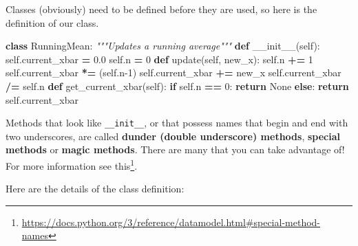 \documentclass[12pt,krantz2]{krantz}
\makeatletter
\newenvironment{Shaded}{\begin{snugshade}}{\end{snugshade}}
\newcommand{\CommentTok}[1]{\textcolor[rgb]{0.37,0.37,0.37}{\textit{#1}}}
\newcommand{\ControlFlowTok}[1]{\textcolor[rgb]{0.27,0.27,0.27}{\textbf{#1}}}
\newcommand{\DecValTok}[1]{\textcolor[rgb]{0.06,0.06,0.06}{#1}}
\newcommand{\FloatTok}[1]{\textcolor[rgb]{0.06,0.06,0.06}{#1}}
\newcommand{\FunctionTok}[1]{\textcolor[rgb]{0,0,0}{#1}}
\newcommand{\KeywordTok}[1]{\textcolor[rgb]{0.27,0.27,0.27}{\textbf{#1}}}
\newcommand{\NormalTok}[1]{#1}
\newcommand{\OperatorTok}[1]{\textcolor[rgb]{0.43,0.43,0.43}{\textbf{#1}}}
\newcommand{\VariableTok}[1]{\textcolor[rgb]{0,0,0}{#1}}
\renewcommand{\href}[2]{#2\footnote{\url{#1}}}
\newenvironment{kframe}{%
\medskip{}
\setlength{\fboxsep}{.8em}
 \def\at@end@of@kframe{}%
 \ifinner\ifhmode%
  \def\at@end@of@kframe{\end{minipage}}%
  \begin{minipage}{\columnwidth}%
 \fi\fi%
 \def\FrameCommand##1{\hskip\@totalleftmargin \hskip-\fboxsep
 \colorbox{shadecolor}{##1}\hskip-\fboxsep
     \hskip-\linewidth \hskip-\@totalleftmargin \hskip\columnwidth}%
 \MakeFramed {\advance\hsize-\width
   \@totalleftmargin\z@ \linewidth\hsize
   \@setminipage}}%
 {\par\unskip\endMakeFramed%
 \at@end@of@kframe}
\renewenvironment{Shaded}{\begin{kframe}}{\end{kframe}}
\makeatother
\begin{document}
Classes (obviously) need to be defined before they are used, so here is the definition of our class.

\begin{Shaded}
\begin{Highlighting}[]
\KeywordTok{class}\NormalTok{ RunningMean:}
    \CommentTok{"""Updates a running average"""}
    \KeywordTok{def} \FunctionTok{__init__}\NormalTok{(}\VariableTok{self}\NormalTok{):}
        \VariableTok{self}\NormalTok{.current_xbar }\OperatorTok{=} \FloatTok{0.0}
        \VariableTok{self}\NormalTok{.n }\OperatorTok{=} \DecValTok{0}
    \KeywordTok{def}\NormalTok{ update(}\VariableTok{self}\NormalTok{, new_x):}
        \VariableTok{self}\NormalTok{.n }\OperatorTok{+=} \DecValTok{1}
        \VariableTok{self}\NormalTok{.current_xbar }\OperatorTok{*=}\NormalTok{ (}\VariableTok{self}\NormalTok{.n}\DecValTok{-1}\NormalTok{)}
        \VariableTok{self}\NormalTok{.current_xbar }\OperatorTok{+=}\NormalTok{ new_x}
        \VariableTok{self}\NormalTok{.current_xbar }\OperatorTok{/=} \VariableTok{self}\NormalTok{.n}
    \KeywordTok{def}\NormalTok{ get_current_xbar(}\VariableTok{self}\NormalTok{):}
        \ControlFlowTok{if} \VariableTok{self}\NormalTok{.n }\OperatorTok{==} \DecValTok{0}\NormalTok{:}
            \ControlFlowTok{return} \VariableTok{None}
        \ControlFlowTok{else}\NormalTok{:}
            \ControlFlowTok{return} \VariableTok{self}\NormalTok{.current_xbar}
\end{Highlighting}
\end{Shaded}

\begin{rmd-details}
Methods that look like \texttt{\_\_init\_\_}, or that possess names that begin and end with two underscores, are called \textbf{dunder (double underscore) methods}, \textbf{special methods} or \textbf{magic methods}. There are many that you can take advantage of! For more information see \href{https://docs.python.org/3/reference/datamodel.html\#special-method-names}{this}.

\end{rmd-details}

Here are the details of the class definition:
\end{document}

